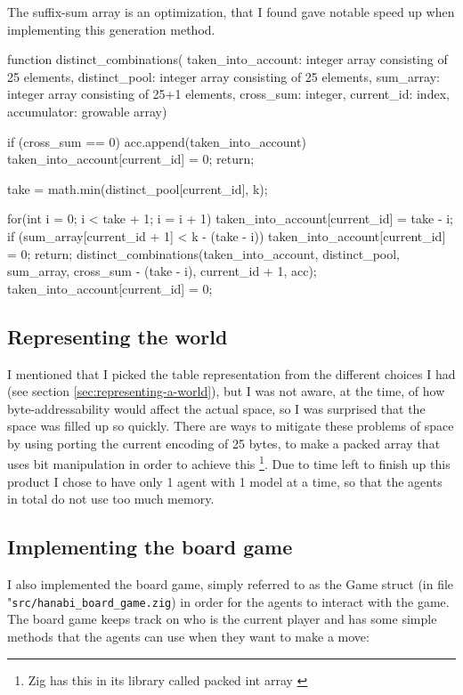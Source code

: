 The suffix-sum array is an optimization, that I found gave notable speed up when implementing this generation method.



\begin{verbbox}
function distinct_combinations(
 taken_into_account: integer array consisting of 25 elements, 
 distinct_pool: integer array consisting of 25 elements, 
 sum_array: integer array consisting of 25+1 elements, 
 cross_sum: integer, 
 current_id: index, 
 accumulator: growable array) {
    if (cross_sum == 0) {
        acc.append(taken_into_account) 
        taken_into_account[current_id] = 0;
        return;
    }

    take = math.min(distinct_pool[current_id], k); 

    for(int i = 0; i < take + 1; i = i + 1){
            taken_into_account[current_id] = take - i;
            if (sum_array[current_id + 1] < k - (take - i)) {
                taken_into_account[current_id] = 0;
                return;
            }
            distinct_combinations(taken_into_account, 
	     distinct_pool, 
	     sum_array, 
	     cross_sum - (take - i), 
	     current_id + 1, acc);
     }
     taken_into_account[current_id] = 0;
}
\end{verbbox}
{\centering
\fbox{\theverbbox}
\par
\label{code:distinct-combinations}
}



\subsection{Representing the world}
I mentioned that I picked the table representation from the different choices I had (see section \ref{sec:representing-a-world}), but I was not aware, at the time, of how byte-addressability would affect the actual space, so I was surprised that the space was filled up so quickly. There are ways to mitigate these problems of space by using porting the current encoding of 25 bytes, to make a packed array that uses bit manipulation in order to achieve this \footnote{Zig has this in its library called packed int array \cite{zigpackedintarr}}. Due to time left to finish up this product I chose to have only 1 agent with 1 model at a time, so that the agents in total do not use too much memory.

\subsection{Implementing the board game}
I also implemented the board game, simply referred to as the Game struct (in file "{\tt src/hanabi\_board\_game.zig}) in order for the agents to interact with the game. The board game keeps track on who is the current player and has some simple methods that the agents can use when they want to make a move:

